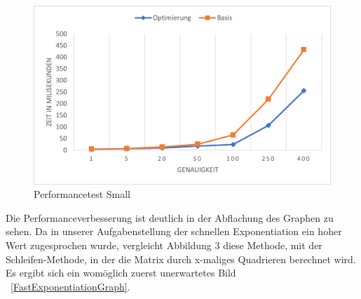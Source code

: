 \documentclass[course=erap]{aspdoc}
\begin{document}
    \begin{figure}
        \centering
        \includegraphics[scale = 1.0]{Images/PerformanceSmall.png}
        \caption{Performancetest Small}
        \label{PerformanceSmall}
    \end{figure}Die Performanceverbesserung ist deutlich in der Abflachung des Graphen zu sehen. Da in unserer Aufgabenstellung der schnellen Exponentiation ein hoher Wert zugesprochen wurde, vergleicht Abbildung 3 diese Methode, mit der Schleifen-Methode, in der die Matrix durch x-maliges Quadrieren berechnet wird. Es ergibt sich ein womöglich zuerst unerwartetes Bild ~\ref{FastExponentiationGraph}.
\end{document}
